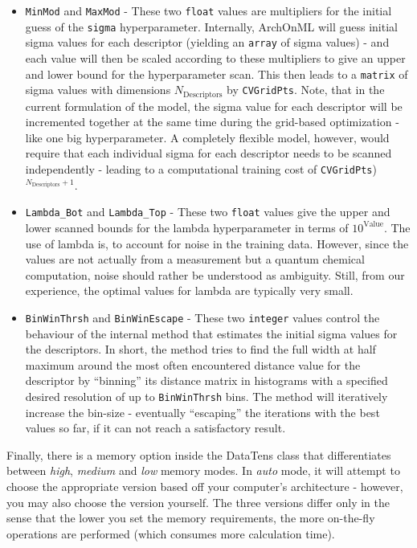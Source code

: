 \documentclass[12pt]{achemso}
\begin{document}
\begin{itemize}
    \item \texttt{MinMod} and \texttt{MaxMod} - These two \texttt{float} values are multipliers for the initial guess of the \texttt{sigma} hyperparameter. Internally, ArchOnML will guess initial sigma values for each descriptor (yielding an \texttt{array} of sigma values) - and each value will then be scaled according to these multipliers to give an upper and lower bound for the hyperparameter scan. This then leads to a \texttt{matrix} of sigma values with dimensions $N_\mathrm{Descriptors}$ by \texttt{CVGridPts}. Note, that in the current formulation of the model, the sigma value for each descriptor will be incremented together at the same time during the grid-based optimization - like one big hyperparameter. A completely flexible model, however, would require that each individual sigma for each descriptor needs to be scanned independently - leading to a computational training cost of \texttt{CVGridPts})$^{N_\mathrm{Descriptors}+1}$.

    \item \texttt{Lambda\_Bot} and \texttt{Lambda\_Top} - These two \texttt{float} values give the upper and lower scanned bounds for the lambda hyperparameter in terms of $10^\mathrm{Value}$. The use of lambda is, to account for noise in the training data. However, since the values are not actually from a measurement but a quantum chemical computation, noise should rather be understood as ambiguity. Still, from our experience, the optimal values for lambda are typically very small.

    \item \texttt{BinWinThrsh} and \texttt{BinWinEscape} - These two \texttt{integer} values control the behaviour of the internal method that estimates the initial sigma values for the descriptors. In short, the method tries to find the full width at half maximum around the most often encountered distance value for the descriptor by ``binning'' its distance matrix in histograms with a specified desired resolution of up to \texttt{BinWinThrsh} bins. The method will iteratively increase the bin-size - eventually ``escaping'' the iterations with the best values so far, if it can not reach a satisfactory result.
\end{itemize}

\noindent Finally, there is a memory option inside the DataTens class that differentiates between \textit{high}, \textit{medium} and \textit{low} memory modes. In \textit{auto} mode, it will attempt to choose the appropriate version based off your computer's architecture - however, you may also choose the version yourself. The three versions differ only in the sense that the lower you set the memory requirements, the more on-the-fly operations are performed (which consumes more calculation time).
\end{document}

